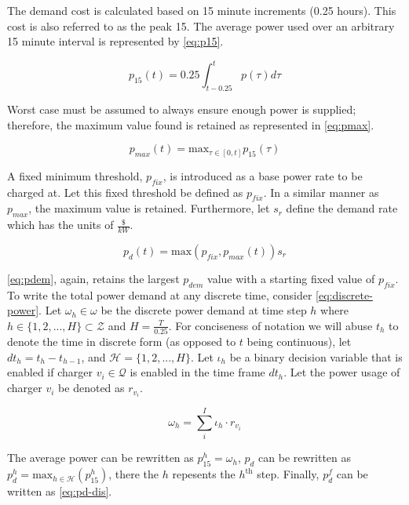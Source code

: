 \documentclass[11pt,a4paper,final]{article}
\newcommand{\Qset}{\mathcal{Q}}             %
\newcommand{\Hset}{\mathcal{H}}             %
\begin{document}
The demand cost is calculated based on 15 minute increments (0.25 hours). This cost is also referred to as the peak 15. The
average power used over an arbitrary 15 minute interval is represented by \ref{eq:p15}.

\begin{equation}
\label{eq:p15}
p_{15}(t) = 0.25 \int_{t-0.25}^{t} p(\tau) d\tau
\end{equation}

Worst case must be assumed to always ensure enough power is supplied; therefore, the maximum value found is retained as
represented in \ref{eq:pmax}.

\begin{equation}
\label{eq:pmax}
p_{max}(t) = \text{max}_{\tau \in [0,t]}p_{15}(\tau)
\end{equation}

A fixed minimum threshold, \(p_{fix}\), is introduced as a base power rate to be charged at. Let this fixed threshold be
defined as \(p_{fix}\). In a similar manner as \(p_{max}\), the maximum value is retained. Furthermore, let \(s_r\) define the
demand rate which has the units of \(\frac{\$}{kW}\).

\begin{equation}
\label{eq:pdem}
p_d(t) = \text{max}(p_{fix},p_{max}(t))s_r
\end{equation}

\ref{eq:pdem}, again, retains the largest \(p_{dem}\) value with a starting fixed value of \(p_{fix}\). To write the total power
demand at any discrete time, consider \ref{eq:discrete-power}. Let \(\omega_h \in \omega\) be the discrete power demand at time step \(h\)
where \(h \in \{ 1, 2, ..., H \} \subset \mathcal{Z}\) and \(H = \frac{T}{0.25}\). For conciseness of notation we will abuse \(t_h\) to denote
the time in discrete form (as opposed to \(t\) being continuous), let \(dt_h = t_h - t_{h-1}\), and \(\Hset = \{ 1, 2, ..., H
\}\). Let \(\iota_h\) be a binary decision variable that is enabled if charger \(v_i \in \Qset\) is enabled in the time frame
\(dt_h\). Let the power usage of charger \(v_i\) be denoted as \(r_{v_i}\).

\begin{equation}
\label{eq:discrete-power}
  \omega_h = \sum_i^I \iota_h \cdot r_{v_i}
\end{equation}

The average power can be rewritten as \(p_{15}^h = \omega_h\), \(p_d\) can be rewritten as \(p_d^h = \text{max}_{h \in \Hset}
(p_{15}^{h})\), there the \(h\) repesents the \(h^{\text{th}}\) step. Finally, \(p_d^f\) can be written as \ref{eq:pd-dis}.
\end{document}
